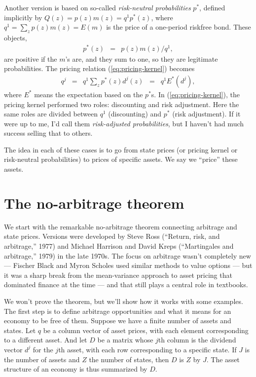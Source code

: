 \documentclass[11pt]{article}
\begin{document}
Another version is based on so-called {\it risk-neutral probabilities\/} $p^*$,
defined implicitly by $ Q(z) = p(z) m(z) = q^1 p^*(z) $,
where $q^1 = \sum_z p(z) m(z) = E(m)$ is the price of a one-period riskfree bond.
These objects,
\begin{eqnarray*}
    p^*(z) &=& p(z) m(z) /q^1 ,
\end{eqnarray*}
are positive if the $m$'s are, and they sum to one,
so they are legitimate probabilities.
The pricing relation (\ref{eq:pricing-kernel}) becomes
\begin{eqnarray}
    q^j   &=& q^1 \sum_z p^*(z) d^j(z)  \;\;=\;\; q^1 E^* (d^j) ,
    \label{eq:risk-neutral-probs}
\end{eqnarray}
where $E^*$ means the expectation based on the $p^*$s.
In (\ref{eq:pricing-kernel}), the pricing kernel performed two roles:
discounting and risk adjustment.
Here the same roles are divided between $q^1$ (discounting)
and $p^*$ (risk adjustment).
If it were up to me, I'd call them {\it risk-adjusted probabilities\/},
but I haven't had much success selling that to others.


The idea in each of these cases is to go from
state prices (or pricing kernel or risk-neutral probabilities)
to prices of specific assets.
We say we ``price'' these assets.


\section{The no-arbitrage theorem}

We start with the remarkable no-arbitrage theorem
connecting arbitrage and state prices.
Versions were developed by
Steve Ross (``Return, risk, and arbitrage,'' 1977)
and Michael Harrison and David Kreps (``Martingales and arbitrage,'' 1979)
in the late 1970s.
The focus on arbitrage wasn't completely new ---
Fischer Black and Myron Scholes used similar methods to value options ---
but it was a sharp break from the mean-variance approach to asset pricing
that dominated finance at the time ---
and that still plays a central role in textbooks.

We won't prove the theorem, but we'll show how it works with some examples.
The first step is to define arbitrage opportunities
and what it means for an economy to be free of them.
Suppose we have a finite number of assets and states.
Let $q$ be a column vector of asset prices,
with each element corresponding to a different asset.
And let $D$ be a matrix whose $j$th column is the dividend
vector $d^j$ for the $j$th asset,
with each row corresponding to a specific state.
If $J$ is the number of assets and $Z$ the number of states,
then $D$ is $Z$ by $J$.
The asset structure of an economy is thus summarized by $D$.
\end{document}
